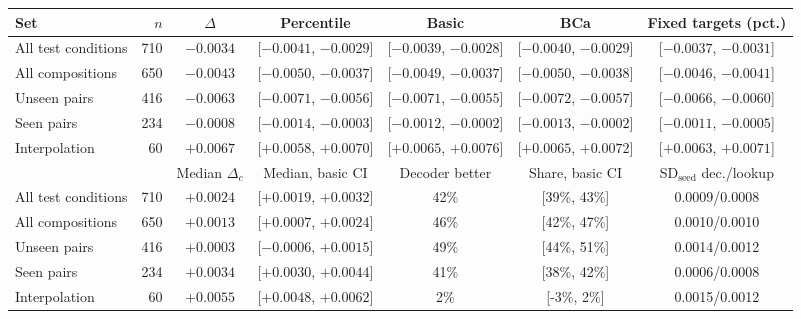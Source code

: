 \setlength{\tabcolsep}{3pt}
\begin{tabular}{lrccccc}
\toprule
Set & $n$ & $\Delta$ & Percentile & Basic & BCa & Fixed targets (pct.) \\
\midrule
All test conditions & 710 & $-0.0034$ & [$-0.0041$, $-0.0029$] & [$-0.0039$, $-0.0028$] & [$-0.0040$, $-0.0029$] & [$-0.0037$, $-0.0031$] \\
All compositions & 650 & $-0.0043$ & [$-0.0050$, $-0.0037$] & [$-0.0049$, $-0.0037$] & [$-0.0050$, $-0.0038$] & [$-0.0046$, $-0.0041$] \\
Unseen pairs & 416 & $-0.0063$ & [$-0.0071$, $-0.0056$] & [$-0.0071$, $-0.0055$] & [$-0.0072$, $-0.0057$] & [$-0.0066$, $-0.0060$] \\
Seen pairs & 234 & $-0.0008$ & [$-0.0014$, $-0.0003$] & [$-0.0012$, $-0.0002$] & [$-0.0013$, $-0.0002$] & [$-0.0011$, $-0.0005$] \\
Interpolation & 60 & $+0.0067$ & [$+0.0058$, $+0.0070$] & [$+0.0065$, $+0.0076$] & [$+0.0065$, $+0.0072$] & [$+0.0063$, $+0.0071$] \\
\midrule
 & & Median $\Delta_c$ & Median, basic CI & Decoder better & Share, basic CI & SD$_\text{seed}$ dec./lookup \\
\midrule
All test conditions & 710 & $+0.0024$ & [$+0.0019$, $+0.0032$] & 42\% & [39\%, 43\%] & 0.0009/0.0008 \\
All compositions & 650 & $+0.0013$ & [$+0.0007$, $+0.0024$] & 46\% & [42\%, 47\%] & 0.0010/0.0010 \\
Unseen pairs & 416 & $+0.0003$ & [$-0.0006$, $+0.0015$] & 49\% & [44\%, 51\%] & 0.0014/0.0012 \\
Seen pairs & 234 & $+0.0034$ & [$+0.0030$, $+0.0044$] & 41\% & [38\%, 42\%] & 0.0006/0.0008 \\
Interpolation & 60 & $+0.0055$ & [$+0.0048$, $+0.0062$] & 2\% & [-3\%, 2\%] & 0.0015/0.0012 \\
\bottomrule
\end{tabular}
